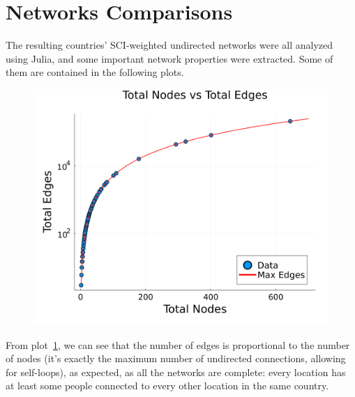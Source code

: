 \section{Networks Comparisons}
The resulting countries' SCI-weighted undirected networks were all analyzed using Julia, and some important network properties were extracted. Some of them are contained in the following plots.

\begin{figure}[H]
    \centering
    \includegraphics[height=0.4\textwidth]{images/task44/TotalNodesVsTotalEdges.png}
    \caption{}
    \label{fig:TotalNodesVsTotalEdges}
\end{figure}

From plot~\ref{fig:TotalNodesVsTotalEdges}, we can see that the number of edges is proportional to the number of nodes (it's exactly the maximum number of undirected connections, allowing for self-loops), as expected, as all the networks are complete: every location has at least some people connected to every other location in the same country.

